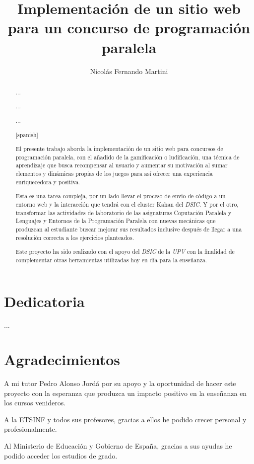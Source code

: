 \documentclass[11pt,spanish,listoffigures,listoftables]{tfgetsinf}
\title{Implementación de un sitio web para un concurso de programación paralela}
\author{Nicolás Fernando Martini}
\newenvironment{dedication}
{%
	\thispagestyle{empty}%
	\itshape             %
}
{\par %
	\vspace{\stretch{3}} %
	\clearpage           %
}
\begin{document}
	

\begin{dedication}	
	
	\chapter*{Dedicatoria}
	
	...

	\chapter*{Agradecimientos}
		A mi tutor Pedro Alonso Jordá por su apoyo y la oportunidad de hacer este proyecto con la esperanza que produzca un impacto positivo en la enseñanza en los cursos venideros. \par
		A la ETSINF y todos sus profesores, gracias a ellos he podido crecer personal y profesionalmente. \par
		Al Ministerio de Educación y Gobierno de España, gracias a sus ayudas he podido acceder los estudios de grado.
		
\end{dedication}

\begin{abstract}

... \par

... \par

... \par

\end{abstract}

\begin{abstract}[spanish]
	
El presente trabajo aborda la implementación de un sitio web para concursos de programación paralela, con el añadido de la gamificación o ludificación, una técnica de aprendizaje que busca recompensar al usuario y aumentar su motivación al sumar elementos y dinámicas propias de los juegos para así ofrecer una experiencia enriquecedora y positiva. \par 

Esta es una tarea compleja, por un lado llevar el proceso de envío de código a un entorno web y la interacción que tendrá con el cluster Kahan del \textit{DSIC}. Y por el otro, transformar las actividades de laboratorio de las asignaturas Coputación Paralela y Lenguajes y Entornos de la Programación Paralela con nuevas mecánicas que produzcan al estudiante buscar mejorar sus resultados inclusive después de llegar a una resolución correcta a los ejercicios planteados. \par

Este proyecto ha sido realizado con el apoyo del \textit{DSIC} de la \textit{UPV} con la finalidad de complementar otras herramientas utilizadas hoy en día para la enseñanza. \par


\end{abstract}
\end{document}

